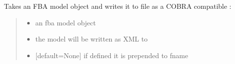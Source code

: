 \documentclass[letterpaper,12pt,english]{sphinxmanual}
\begin{document}
\begin{fulllineitems}

\pysigstartsignatures
\pysiglinewithargsret
{}
{\sphinxparamcomma {}\sphinxparamcomma {}}
{}
\pysigstopsignatures
\sphinxAtStartPar
Takes an FBA model object and writes it to file as a COBRA compatible :
\begin{quote}\begin{description}
\begin{itemize}
\item {} 
\sphinxAtStartPar
{} \textendash{} an fba model object

\item {} 
\sphinxAtStartPar
{} \textendash{} the model will be written as XML to 

\item {} 
\sphinxAtStartPar
{} \textendash{} {[}default=None{]} if defined it is prepended to fname

\end{itemize}

\end{description}\end{quote}

\end{fulllineitems}
\end{document}
